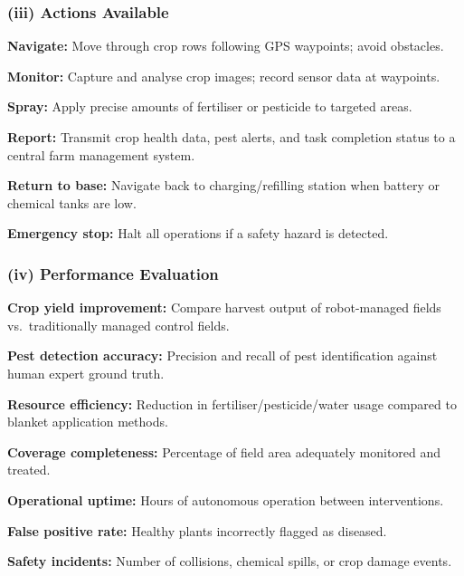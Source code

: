 \documentclass[12pt, a4paper]{article}
\begin{document}
\subsubsection*{(iii) Actions Available}

\begin{keypoints}
  \item \textbf{Navigate:} Move through crop rows following GPS waypoints; avoid obstacles.
  \item \textbf{Monitor:} Capture and analyse crop images; record sensor data at waypoints.
  \item \textbf{Spray:} Apply precise amounts of fertiliser or pesticide to targeted areas.
  \item \textbf{Report:} Transmit crop health data, pest alerts, and task completion status to a central farm management system.
  \item \textbf{Return to base:} Navigate back to charging/refilling station when battery or chemical tanks are low.
  \item \textbf{Emergency stop:} Halt all operations if a safety hazard is detected.
\end{keypoints}

\subsubsection*{(iv) Performance Evaluation}

\begin{keypoints}
  \item \textbf{Crop yield improvement:} Compare harvest output of robot-managed fields vs.\ traditionally managed control fields.
  \item \textbf{Pest detection accuracy:} Precision and recall of pest identification against human expert ground truth.
  \item \textbf{Resource efficiency:} Reduction in fertiliser/pesticide/water usage compared to blanket application methods.
  \item \textbf{Coverage completeness:} Percentage of field area adequately monitored and treated.
  \item \textbf{Operational uptime:} Hours of autonomous operation between interventions.
  \item \textbf{False positive rate:} Healthy plants incorrectly flagged as diseased.
  \item \textbf{Safety incidents:} Number of collisions, chemical spills, or crop damage events.
\end{keypoints}
\end{document}
